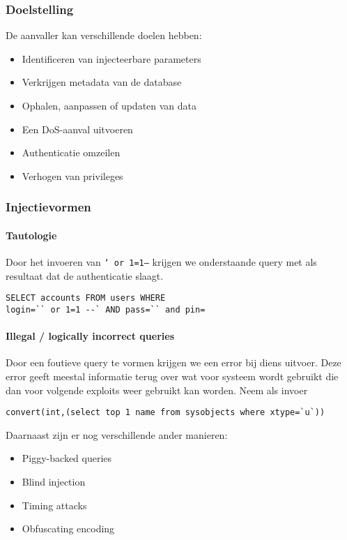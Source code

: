 \documentclass[../main.tex]{subfiles}
\begin{document}
\subsubsection{Doelstelling}
De aanvaller kan verschillende doelen hebben:
\begin{multicols}{2}
\begin{itemize}
	\item Identificeren van injecteerbare parameters
	\item Verkrijgen metadata van de database
	\item Ophalen, aanpassen of updaten van data
	\item Een DoS-aanval uitvoeren
	\item Authenticatie omzeilen
	\item Verhogen van privileges
\end{itemize}
\end{multicols}

\subsubsection{Injectievormen}

\paragraph{Tautologie} Door het invoeren van \texttt{` or 1=1--} krijgen we onderstaande query met als resultaat dat de authenticatie slaagt.
\begin{lstlisting}[caption=Tautologie]
SELECT accounts FROM users WHERE
login=`` or 1=1 --` AND pass=`` and pin=
\end{lstlisting}

\paragraph{Illegal / logically incorrect queries} Door een foutieve query te vormen krijgen we een error bij diens uitvoer.
Deze error geeft meestal informatie terug over wat voor systeem wordt gebruikt die dan voor volgende exploits weer gebruikt kan worden.
Neem als invoer
\begin{lstlisting}[caption=Illegal input]
convert(int,(select top 1 name from sysobjects where xtype=`u`))
\end{lstlisting}
\noindent
Daarnaast zijn er nog verschillende ander manieren:
\begin{multicols}{2}
\begin{itemize}
	\item Piggy-backed queries
	\item Blind injection
	\item Timing attacks
	\item Obfuscating encoding
\end{itemize}
\end{multicols}
\end{document}
